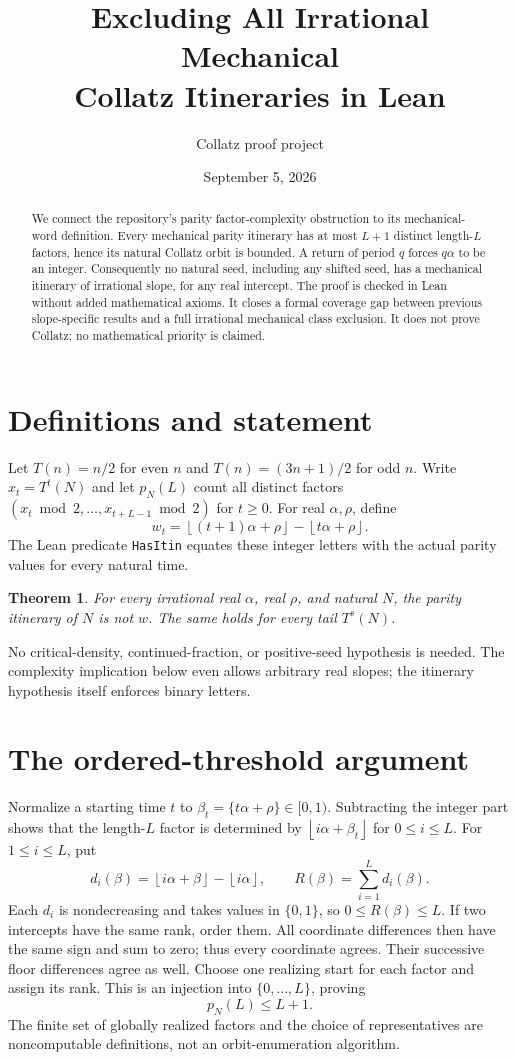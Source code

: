 \documentclass[10pt]{article}
\title{Excluding All Irrational Mechanical\\Collatz Itineraries in Lean}
\author{Collatz proof project}
\date{September 5, 2026}
\newtheorem{theorem}{Theorem}
\newcommand{\floor}[1]{\left\lfloor#1\right\rfloor}
\begin{document}
\maketitle
\begin{abstract}
We connect the repository's parity factor-complexity obstruction to its
mechanical-word definition. Every mechanical parity itinerary has at most
$L+1$ distinct length-$L$ factors, hence its natural Collatz orbit is bounded.
A return of period $q$ forces $q\alpha$ to be an integer. Consequently no
natural seed, including any shifted seed, has a mechanical itinerary of
irrational slope, for any real intercept. The proof is checked in Lean
without added mathematical axioms. It closes a formal coverage gap between
previous slope-specific results and a full irrational mechanical class
exclusion. It does not prove Collatz; no mathematical priority is claimed.
\end{abstract}

\section{Definitions and statement}
Let $T(n)=n/2$ for even $n$ and $T(n)=(3n+1)/2$ for odd $n$.
Write $x_t=T^t(N)$ and let $p_N(L)$ count all distinct factors
$(x_t\bmod2,\ldots,x_{t+L-1}\bmod2)$ for $t\ge0$.
For real $\alpha,\rho$, define
\[
w_t=\floor{(t+1)\alpha+\rho}-\floor{t\alpha+\rho}.
\]
The Lean predicate \texttt{HasItin} equates these integer letters with
the actual parity values for every natural time.
\begin{theorem}
For every irrational real $\alpha$, real $\rho$, and natural $N$, the
parity itinerary of $N$ is not $w$. The same holds for every tail $T^s(N)$.
\end{theorem}
No critical-density, continued-fraction, or positive-seed hypothesis is
needed. The complexity implication below even allows arbitrary real slopes;
the itinerary hypothesis itself enforces binary letters.

\section{The ordered-threshold argument}
Normalize a starting time $t$ to
$\beta_t=\{t\alpha+\rho\}\in[0,1)$.
Subtracting the integer part shows that the length-$L$ factor is determined
by $\floor{i\alpha+\beta_t}$ for $0\le i\le L$.
For $1\le i\le L$, put
\[
d_i(\beta)=\floor{i\alpha+\beta}-\floor{i\alpha},\qquad
R(\beta)=\sum_{i=1}^L d_i(\beta).
\]
Each $d_i$ is nondecreasing and takes values in $\{0,1\}$, so
$0\le R(\beta)\le L$. If two intercepts have the same rank, order them.
All coordinate differences then have the same sign and sum to zero;
thus every coordinate agrees. Their successive floor differences agree
as well. Choose one realizing start for each factor and assign its rank.
This is an injection into $\{0,\ldots,L\}$, proving
\[
p_N(L)\le L+1.
\]
The finite set of globally realized factors and the choice of representatives
are noncomputable definitions, not an orbit-enumeration algorithm.
\end{document}
